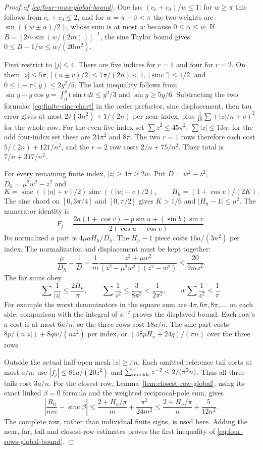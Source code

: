 \begin{proof}[Proof of \eqref{eq:four-rows-global-bound}]
One has $(c_e+c_d)/w\leq1$: for $w\geq\pi$ this follows from
$c_e+c_d\leq2$, and for $w=\pi-\beta<\pi$ the two weights are
$\sin((w\pm\alpha)/2)$, whose sum is at most $w$ because
$0\leq\alpha\leq w$. If $B=[2m\sin(w/(2m))]^{-1}$, the sine
Taylor bound gives $0\leq B-1/w\leq w/(20m^2)$.

First restrict to $|j|\leq4$. There are five indices for $r=1$ and
four for $r=2$. On them $|z|\leq5\pi$,
$|(u\pm v)/2|\leq7\pi/(2n)<1$,
$|\operatorname{sinc}'|\leq1/2$, and
$0\leq1-\tau(y)\leq2y^2/5$. The last inequality follows from
$\sin y-y\cos y=\int_0^y t\sin t\,dt\leq y^3/3$ and
$\sin y\geq5y/6$. Subtracting the two formulas
\eqref{eq:finite-sinc-chart} in the order prefactor, sinc displacement,
then tau error gives at most $2/(3n^2)+1/(2n)$ per near index,
plus $\frac1{10}\sum(|z|/n+v)^2$ for the whole row. For the even
five-index set $\sum z^2\leq45\pi^2$, $\sum|z|\leq13\pi$;
for the odd four-index set these are $24\pi^2$ and $8\pi$.
The two $r=1$ rows therefore each cost
$5/(2n)+121/n^2$, and the $r=2$ row costs $2/n+75/n^2$.
Their total is $7/n+317/n^2$.

For every remaining finite index, $|z|\geq4\pi\geq2w$.
Put $D=w^2-z^2$, $D_h=\mu^2w^2-z^2$ and
\[
 K=\operatorname{sinc}((|u|+v)/2)\operatorname{sinc}((|u|-v)/2),
 \qquad H_h=(1+\cos v)/(2K).
\]
The sine chord on $[0,3\pi/4]$ and $[0,\pi/2]$ gives
$K>1/6$ and $|H_h-1|\leq u^2$. The numerator identity is
\[
 F_j=\frac{2a(1+\cos v)-p\sin u+(\sin b)\sin v}
                {2(\cos u-\cos v)}.
\]
Its normalized $a$ part is $4\mu aH_h/D_h$. The $H_h-1$ piece
costs $16a/(3n^2)$ per index. The normalization and displacement
must be kept together:
\[
 \frac\mu{D_h}-\frac1D
 =\frac1m\frac{z^2+\mu w^2}{(z^2-\mu^2w^2)(z^2-w^2)}
 \leq\frac{20}{9mz^2}.
\]
The far sums obey
\[
 \sum\frac1{|z|}\leq\frac{2H_n}\pi,\qquad
 \sum\frac1{z^2}\leq\frac3{8\pi^2}<\frac1{2\pi^2},\qquad
 w\sum\frac1{z^2}<\frac1\pi.
\]
For example the worst denominators in the square sum are
$4\pi,6\pi,8\pi,\ldots$ on each side; comparison with the integral
of $x^{-2}$ proves the displayed bound. Each row's $a$ cost is at
most $6a/n$, so the three rows cost $18a/n$. The sine part costs
$8p/(n|z|)+8qw/(nz^2)$ per index, or
$(48pH_n+24q)/(\pi n)$ over the three rows.

Outside the actual half-open mesh $|z|\geq\pi n$. Each omitted
reference tail costs at most $a/n$: use
$|f_j|\leq81a/(20z^2)$ and
$\sum_{\rm outside}z^{-2}\leq2/(\pi^2n)$.
Thus all three tails cost $3a/n$.
For the closest row, Lemma~\ref{lem:closest-row-global}, using its
exact linked $\beta=0$ formula and the weighted reciprocal-pole sum, gives
\[
 \left|\frac{R_0}{nm}-\operatorname{sinc}\beta\right|
 \leq\frac{2+H_n/\pi}{m}+\frac{\pi^2}{24m^2}
 \leq\frac{2+H_n/\pi}{n}+\frac5{12n^2}.
\]
The complete row, rather than individual finite signs, is used here.
Adding the near, far, tail and closest-row estimates proves the first
inequality of \eqref{eq:four-rows-global-bound}.


\end{proof}
